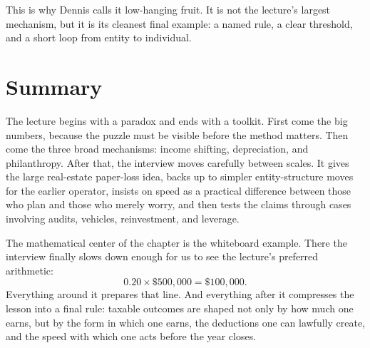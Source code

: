This is why Dennis calls it low-hanging fruit. It is not the lecture's largest mechanism, but it is its cleanest final example: a named rule, a clear threshold, and a short loop from entity to individual.

\section{Summary}

The lecture begins with a paradox and ends with a toolkit. First come the big numbers, because the puzzle must be visible before the method matters. Then come the three broad mechanisms: income shifting, depreciation, and philanthropy. After that, the interview moves carefully between scales. It gives the large real-estate paper-loss idea, backs up to simpler entity-structure moves for the earlier operator, insists on speed as a practical difference between those who plan and those who merely worry, and then tests the claims through cases involving audits, vehicles, reinvestment, and leverage.

The mathematical center of the chapter is the whiteboard example. There the interview finally slows down enough for us to see the lecture's preferred arithmetic:
\[
0.20\times \$500{,}000=\$100{,}000.
\]
Everything around it prepares that line. And everything after it compresses the lesson into a final rule: taxable outcomes are shaped not only by how much one earns, but by the form in which one earns, the deductions one can lawfully create, and the speed with which one acts before the year closes.